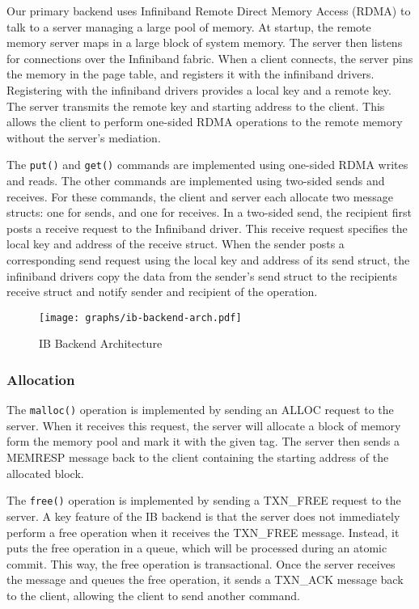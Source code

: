 Our primary backend uses Infiniband Remote Direct Memory Access (RDMA) to talk
to a server managing a large pool of memory. At startup, the remote memory
server maps in a large block of system memory. The server then listens for
connections over the Infiniband fabric. When a client connects, the server
pins the memory in the page table, and registers it with the infiniband drivers.
Registering with the infiniband drivers provides a local key and a remote key.
The server transmits the remote key and starting address to the client.
This allows the client to perform one-sided RDMA operations to the remote
memory without the server's mediation.

The \texttt{put()} and \texttt{get()} commands are implemented using one-sided
RDMA writes and reads. The other commands are implemented using two-sided sends
and receives. For these commands, the client and server each allocate two
message structs: one for sends, and one for receives. In a two-sided send, the
recipient first posts a receive request to the Infiniband driver. This receive
request specifies the local key and address of the receive struct. When the
sender posts a corresponding send request using the local key and address of
its send struct, the infiniband drivers copy the data from the sender's send
struct to the recipients receive struct and notify sender and recipient of the
operation.

\begin{figure}
    \texttt{[image: graphs/ib-backend-arch.pdf]}
    \caption{IB Backend Architecture}
    \label{fig:ib-backend-arch}
\end{figure}

\subsubsection{Allocation}

The \texttt{malloc()} operation is implemented by sending an ALLOC request
to the server. When it receives this request, the server will allocate a
block of memory form the memory pool and mark it with the given tag.
The server then sends a MEMRESP message back to the client containing the
starting address of the allocated block.

The \texttt{free()} operation is implemented by sending a TXN\_FREE request
to the server. A key feature of the IB backend is that the server does not
immediately perform a free operation when it receives the TXN\_FREE message.
Instead, it puts the free operation in a queue, which will be processed
during an atomic commit. This way, the free operation is transactional.
Once the server receives the message and queues the free operation, it sends
a TXN\_ACK message back to the client, allowing the client to send another
command.

